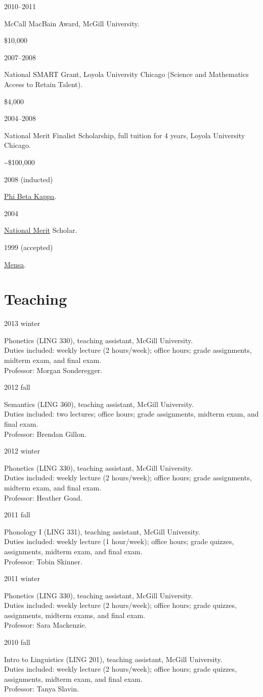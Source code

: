 \documentclass[11pt,letterpaper]{article}
\newcommand{\cvitem}[2]{%
  \begin{minipage}[t]{0.24\textwidth}
    #1 %
  \end{minipage}
  \hfill
  \begin{minipage}[t]{0.74\textwidth}
    #2 %
  \end{minipage}
}
\newcommand{\tadetails}[2]{%
  {\footnotesize Duties included: #1. \\ Professor: #2.}
}
\newcommand{\award}[2]{%
  \begin{minipage}[t]{0.78\textwidth}
    #1        %
  \end{minipage}
  \hfill
  \begin{minipage}[t]{0.20\textwidth}
    \hfill #2 %
  \end{minipage}
}
\begin{document}
\cvitem{2010--2011}{\award{McCall MacBain Award, McGill University.}{\$10,000}}

\cvitem{2007--2008}{\award{National SMART Grant, Loyola University Chicago
(Science and Mathematics Access to Retain Talent).}{\$4,000}}

\cvitem{2004--2008}{\award{National Merit Finalist Scholarship, full tuition for
4 years, Loyola University Chicago.}{\textasciitilde\$100,000}}

\cvitem{2008 (inducted)}{\href{http://www.pbk.org/}{Phi Beta Kappa}.}

\cvitem{2004}{\href{http://www.nationalmerit.org/}{National Merit} Scholar.}

\cvitem{1999 (accepted)}{\href{http://www.mensa.org/}{Mensa}.}



\section*{Teaching}

\cvitem{2013 winter}{Phonetics (LING 330), teaching assistant, McGill
  University. \\ \tadetails{weekly lecture (2 hours/week); office hours; grade
  assignments, midterm exam, and final exam}{Morgan Sonderegger}}

\cvitem{2012 fall}{Semantics (LING 360), teaching assistant, McGill University.
  \\ \tadetails{two lectures; office hours; grade assignments, midterm exam,
  and final exam}{Brendan Gillon}}

\cvitem{2012 winter}{Phonetics (LING 330), teaching assistant, McGill
  University. \\ \tadetails{weekly lecture (2 hours/week); office hours; grade
  assignments, midterm exam, and final exam}{Heather Goad}}

\cvitem{2011 fall}{Phonology I (LING 331), teaching assistant, McGill
  University. \\ \tadetails{weekly lecture (1 hour/week); office hours; grade
  quizzes, assignments, midterm exam, and final exam}{Tobin Skinner}}

\cvitem{2011 winter}{Phonetics (LING 330), teaching assistant, McGill
  University. \\ \tadetails{weekly lecture (2 hours/week); office hours; grade
  quizzes, assignments, midterm exams, and final exam}{Sara Mackenzie}}

\cvitem{2010 fall}{Intro to Linguistics (LING 201), teaching assistant, McGill
  University. \\ \tadetails{weekly lecture (2 hours/week); office hours; grade
  quizzes, assignments, midterm exam, and final exam}{Tanya Slavin}}
\end{document}
